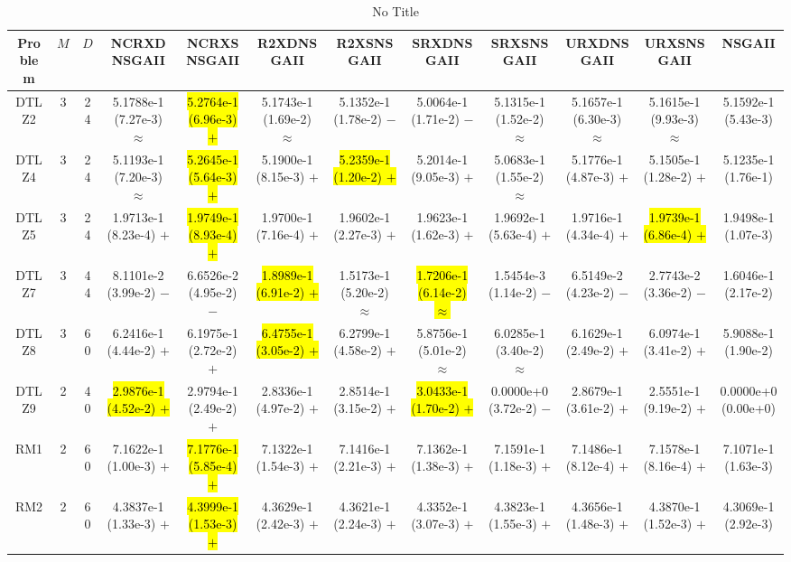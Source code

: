 \documentclass[journal]{IEEEtran}
\begin{document}
\begin{table*}[htbp]
\renewcommand{\arraystretch}{1.2}
\centering
\caption{No Title}
\begin{tabular}{cccccccccccc}
\toprule
Problem&$M$&$D$&NCRXDNSGAII&NCRXSNSGAII&R2XDNSGAII&R2XSNSGAII&SRXDNSGAII&SRXSNSGAII&URXDNSGAII&URXSNSGAII&NSGAII\\
\midrule
\multirow{1}{*}{DTLZ2}&3&24&5.1788e-1 (7.27e-3) $\approx$&\hl{5.2764e-1 (6.96e-3) $+$}&5.1743e-1 (1.69e-2) $\approx$&5.1352e-1 (1.78e-2) $-$&5.0064e-1 (1.71e-2) $-$&5.1315e-1 (1.52e-2) $\approx$&5.1657e-1 (6.30e-3) $\approx$&5.1615e-1 (9.93e-3) $\approx$&5.1592e-1 (5.43e-3)\\
\hline
\multirow{1}{*}{DTLZ4}&3&24&5.1193e-1 (7.20e-3) $\approx$&\hl{5.2645e-1 (5.64e-3) $+$}&5.1900e-1 (8.15e-3) $+$&\hl{5.2359e-1 (1.20e-2) $+$}&5.2014e-1 (9.05e-3) $+$&5.0683e-1 (1.55e-2) $\approx$&5.1776e-1 (4.87e-3) $+$&5.1505e-1 (1.28e-2) $+$&5.1235e-1 (1.76e-1)\\
\hline
\multirow{1}{*}{DTLZ5}&3&24&1.9713e-1 (8.23e-4) $+$&\hl{1.9749e-1 (8.93e-4) $+$}&1.9700e-1 (7.16e-4) $+$&1.9602e-1 (2.27e-3) $+$&1.9623e-1 (1.62e-3) $+$&1.9692e-1 (5.63e-4) $+$&1.9716e-1 (4.34e-4) $+$&\hl{1.9739e-1 (6.86e-4) $+$}&1.9498e-1 (1.07e-3)\\
\hline
\multirow{1}{*}{DTLZ7}&3&44&8.1101e-2 (3.99e-2) $-$&6.6526e-2 (4.95e-2) $-$&\hl{1.8989e-1 (6.91e-2) $+$}&1.5173e-1 (5.20e-2) $\approx$&\hl{1.7206e-1 (6.14e-2) $\approx$}&1.5454e-3 (1.14e-2) $-$&6.5149e-2 (4.23e-2) $-$&2.7743e-2 (3.36e-2) $-$&1.6046e-1 (2.17e-2)\\
\hline
\multirow{1}{*}{DTLZ8}&3&60&6.2416e-1 (4.44e-2) $+$&6.1975e-1 (2.72e-2) $+$&\hl{6.4755e-1 (3.05e-2) $+$}&6.2799e-1 (4.58e-2) $+$&5.8756e-1 (5.01e-2) $\approx$&6.0285e-1 (3.40e-2) $\approx$&6.1629e-1 (2.49e-2) $+$&6.0974e-1 (3.41e-2) $+$&5.9088e-1 (1.90e-2)\\
\hline
\multirow{1}{*}{DTLZ9}&2&40&\hl{2.9876e-1 (4.52e-2) $+$}&2.9794e-1 (2.49e-2) $+$&2.8336e-1 (4.97e-2) $+$&2.8514e-1 (3.15e-2) $+$&\hl{3.0433e-1 (1.70e-2) $+$}&0.0000e+0 (3.72e-2) $-$&2.8679e-1 (3.61e-2) $+$&2.5551e-1 (9.19e-2) $+$&0.0000e+0 (0.00e+0)\\
\hline
\multirow{1}{*}{RM1}&2&60&7.1622e-1 (1.00e-3) $+$&\hl{7.1776e-1 (5.85e-4) $+$}&7.1322e-1 (1.54e-3) $+$&7.1416e-1 (2.21e-3) $+$&7.1362e-1 (1.38e-3) $+$&7.1591e-1 (1.18e-3) $+$&7.1486e-1 (8.12e-4) $+$&7.1578e-1 (8.16e-4) $+$&7.1071e-1 (1.63e-3)\\
\hline
\multirow{1}{*}{RM2}&2&60&4.3837e-1 (1.33e-3) $+$&\hl{4.3999e-1 (1.53e-3) $+$}&4.3629e-1 (2.42e-3) $+$&4.3621e-1 (2.24e-3) $+$&4.3352e-1 (3.07e-3) $+$&4.3823e-1 (1.55e-3) $+$&4.3656e-1 (1.48e-3) $+$&4.3870e-1 (1.52e-3) $+$&4.3069e-1 (2.92e-3)\\

\end{tabular}
\end{table*}
\end{document}
